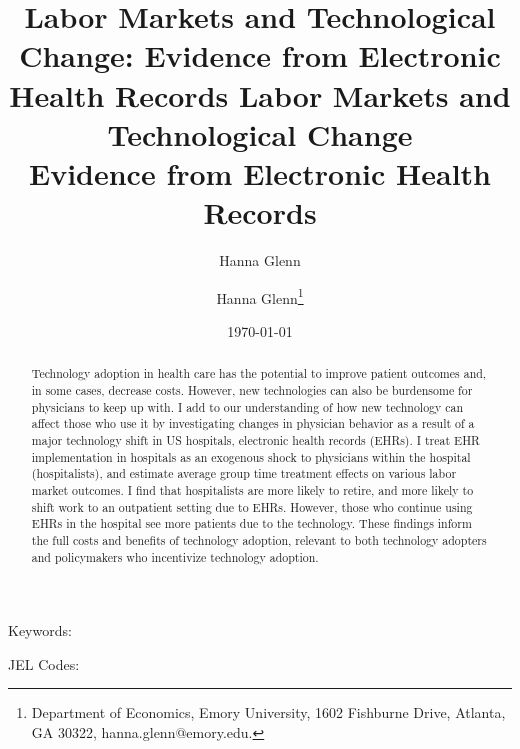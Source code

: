 \documentclass[12pt]{article}
\title{Labor Markets and Technological Change: Evidence from Electronic Health Records}
\author{Hanna Glenn}
\begin{document}
\linespread{1.2}\title{\vspace{-0.5in} Labor Markets and Technological Change \\ \Large Evidence from Electronic Health Records} 
	
	\date{\today}
	
	\author{\vspace{10mm}Hanna Glenn\footnote{Department of Economics, Emory University, 1602 Fishburne Drive, Atlanta, GA 30322, hanna.glenn@emory.edu.} }
	
	\maketitle
	
	\vspace{-0.2in}
	
	\singlespacing\maketitle

\begin{abstract}\small
    Technology adoption in health care has the potential to improve patient outcomes and, in some cases, decrease costs. However, new technologies can also be burdensome for physicians to keep up with. I add to our understanding of how new technology can affect those who use it by investigating changes in physician behavior as a result of a major technology shift in US hospitals, electronic health records (EHRs). I treat EHR implementation in hospitals as an exogenous shock to physicians within the hospital (hospitalists), and estimate average group time treatment effects on various labor market outcomes. I find that hospitalists are more likely to retire, and more likely to shift work to an outpatient setting due to EHRs. However, those who continue using EHRs in the hospital see more patients due to the technology. These findings inform the full costs and benefits of technology adoption, relevant to both technology adopters and policymakers who incentivize technology adoption.
\end{abstract}

\vspace{2in}
	
	\noindent Keywords: 
	
	\noindent JEL Codes: 
	
	\onehalfspacing
	
	\newpage
\end{document}
